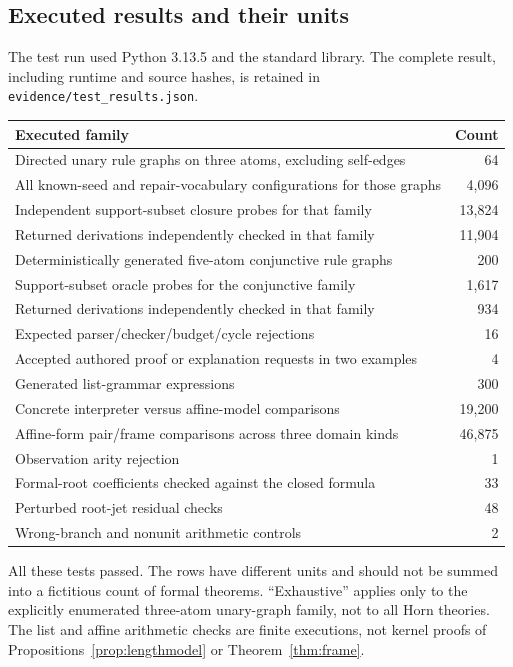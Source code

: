 \documentclass[11pt,a4paper]{article}
\newcommand{\code}[1]{\nolinkurl{#1}}
\theoremstyle{plain}
\theoremstyle{definition}
\theoremstyle{remark}
\begin{document}
\subsection{Executed results and their units}
The test run used Python 3.13.5 and the standard library. The complete result, including runtime and source hashes, is retained in \code{evidence/test_results.json}.
\begin{center}\small
\begin{tabularx}{\textwidth}{@{}Y r@{}}
\toprule Executed family & Count\\\midrule
Directed unary rule graphs on three atoms, excluding self-edges & 64\\
All known-seed and repair-vocabulary configurations for those graphs & 4,096\\
Independent support-subset closure probes for that family & 13,824\\
Returned derivations independently checked in that family & 11,904\\
Deterministically generated five-atom conjunctive rule graphs & 200\\
Support-subset oracle probes for the conjunctive family & 1,617\\
Returned derivations independently checked in that family & 934\\
Expected parser/checker/budget/cycle rejections & 16\\
Accepted authored proof or explanation requests in two examples & 4\\
Generated list-grammar expressions & 300\\
Concrete interpreter versus affine-model comparisons & 19,200\\
Affine-form pair/frame comparisons across three domain kinds & 46,875\\
Observation arity rejection & 1\\
Formal-root coefficients checked against the closed formula & 33\\
Perturbed root-jet residual checks & 48\\
Wrong-branch and nonunit arithmetic controls & 2\\
\bottomrule
\end{tabularx}
\end{center}
All these tests passed. The rows have different units and should not be summed into a fictitious count of formal theorems. ``Exhaustive'' applies only to the explicitly enumerated three-atom unary-graph family, not to all Horn theories. The list and affine arithmetic checks are finite executions, not kernel proofs of Propositions~\ref{prop:lengthmodel} or Theorem~\ref{thm:frame}.
\end{document}
